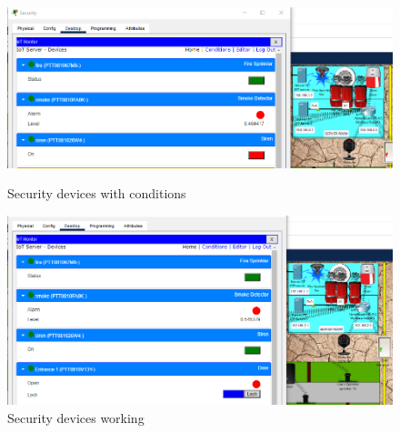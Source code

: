 \documentclass{report}
\begin{document}
\newpage
\begin{figure}[h]
    \centering
   \begin{minipage}{0.40\textwidth}
    \centering
    \includegraphics[width=1\textwidth]{rs/4.png}
    \caption{Security devices with conditions}
    \label{fig:my_label}
    \end{minipage}
    \hfill
    \begin{minipage}{0.40\textwidth}
    \centering
    \includegraphics[width=1\textwidth]{rs/5.png}
    \caption{Security devices working}
    \label{fig:my_label}
    \end{minipage}
\end{figure}
\end{document}
